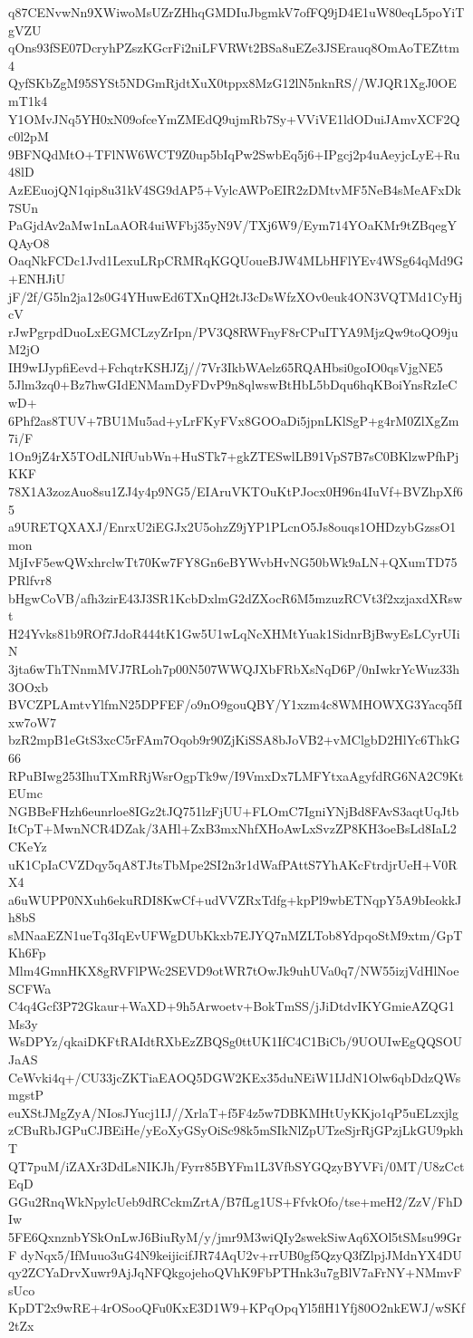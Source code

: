 q87CENvwNn9XWiwoMsUZrZHhqGMDIuJbgmkV7ofFQ9jD4E1uW80eqL5poYiTgVZU
qOns93fSE07DcryhPZszKGcrFi2niLFVRWt2BSa8uEZe3JSErauq8OmAoTEZttm4
QyfSKbZgM95SYSt5NDGmRjdtXuX0tppx8MzG12lN5nknRS//WJQR1XgJ0OEmT1k4
Y1OMvJNq5YH0xN09ofceYmZMEdQ9ujmRb7Sy+VViVE1ldODuiJAmvXCF2Qc0l2pM
9BFNQdMtO+TFlNW6WCT9Z0up5bIqPw2SwbEq5j6+IPgcj2p4uAeyjcLyE+Ru48lD
AzEEuojQN1qip8u31kV4SG9dAP5+VylcAWPoEIR2zDMtvMF5NeB4sMeAFxDk7SUn
PaGjdAv2aMw1nLaAOR4uiWFbj35yN9V/TXj6W9/Eym714YOaKMr9tZBqegYQAyO8
OaqNkFCDc1Jvd1LexuLRpCRMRqKGQUoueBJW4MLbHFlYEv4WSg64qMd9G+ENHJiU
jF/2f/G5ln2ja12s0G4YHuwEd6TXnQH2tJ3cDsWfzXOv0euk4ON3VQTMd1CyHjcV
rJwPgrpdDuoLxEGMCLzyZrIpn/PV3Q8RWFnyF8rCPuITYA9MjzQw9toQO9juM2jO
IH9wIJypfiEevd+FchqtrKSHJZj//7Vr3IkbWAelz65RQAHbsi0goIO0qsVjgNE5
5Jlm3zq0+Bz7hwGIdENMamDyFDvP9n8qlwswBtHbL5bDqu6hqKBoiYnsRzIeCwD+
6Phf2as8TUV+7BU1Mu5ad+yLrFKyFVx8GOOaDi5jpnLKlSgP+g4rM0ZlXgZm7i/F
1On9jZ4rX5TOdLNIfUubWn+HuSTk7+gkZTESwlLB91VpS7B7sC0BKlzwPfhPjKKF
78X1A3zozAuo8su1ZJ4y4p9NG5/EIAruVKTOuKtPJocx0H96n4IuVf+BVZhpXf65
a9URETQXAXJ/EnrxU2iEGJx2U5ohzZ9jYP1PLcnO5Js8ouqs1OHDzybGzssO1mon
MjIvF5ewQWxhrclwTt70Kw7FY8Gn6eBYWvbHvNG50bWk9aLN+QXumTD75PRlfvr8
bHgwCoVB/afh3zirE43J3SR1KcbDxlmG2dZXocR6M5mzuzRCVt3f2xzjaxdXRswt
H24Yvks81b9ROf7JdoR444tK1Gw5U1wLqNcXHMtYuak1SidnrBjBwyEsLCyrUIiN
3jta6wThTNnmMVJ7RLoh7p00N507WWQJXbFRbXsNqD6P/0nIwkrYcWuz33h3OOxb
BVCZPLAmtvYlfmN25DPFEF/o9nO9gouQBY/Y1xzm4c8WMHOWXG3Yacq5fIxw7oW7
bzR2mpB1eGtS3xcC5rFAm7Oqob9r90ZjKiSSA8bJoVB2+vMClgbD2HlYc6ThkG66
RPuBIwg253IhuTXmRRjWsrOgpTk9w/I9VmxDx7LMFYtxaAgyfdRG6NA2C9KtEUmc
NGBBeFHzh6eunrloe8IGz2tJQ751lzFjUU+FLOmC7IgniYNjBd8FAvS3aqtUqJtb
ItCpT+MwnNCR4DZak/3AHl+ZxB3mxNhfXHoAwLxSvzZP8KH3oeBsLd8IaL2CKeYz
uK1CpIaCVZDqy5qA8TJtsTbMpe2SI2n3r1dWafPAttS7YhAKcFtrdjrUeH+V0RX4
a6uWUPP0NXuh6ekuRDI8KwCf+udVVZRxTdfg+kpPl9wbETNqpY5A9bIeokkJh8bS
sMNaaEZN1ueTq3IqEvUFWgDUbKkxb7EJYQ7nMZLTob8YdpqoStM9xtm/GpTKh6Fp
Mlm4GmnHKX8gRVFlPWc2SEVD9otWR7tOwJk9uhUVa0q7/NW55izjVdHlNoeSCFWa
C4q4Gcf3P72Gkaur+WaXD+9h5Arwoetv+BokTmSS/jJiDtdvIKYGmieAZQG1Ms3y
WsDPYz/qkaiDKFtRAIdtRXbEzZBQSg0ttUK1IfC4C1BiCb/9UOUIwEgQQSOUJaAS
CeWvki4q+/CU33jcZKTiaEAOQ5DGW2KEx35duNEiW1IJdN1Olw6qbDdzQWsmgstP
euXStJMgZyA/NIosJYucj1IJ//XrlaT+f5F4z5w7DBKMHtUyKKjo1qP5uELzxjlg
zCBuRbJGPuCJBEiHe/yEoXyGSyOiSc98k5mSIkNlZpUTzeSjrRjGPzjLkGU9pkhT
QT7puM/iZAXr3DdLsNIKJh/Fyrr85BYFm1L3VfbSYGQzyBYVFi/0MT/U8zCctEqD
GGu2RnqWkNpylcUeb9dRCckmZrtA/B7fLg1US+FfvkOfo/tse+meH2/ZzV/FhDIw
5FE6QxnznbYSkOnLwJ6BiuRyM/y/jmr9M3wiQIy2swekSiwAq6XOl5tSMsu99GrF
dyNqx5/IfMuuo3uG4N9keijicifJR74AqU2v+rrUB0gf5QzyQ3fZlpjJMdnYX4DU
qy2ZCYaDrvXuwr9AjJqNFQkgojehoQVhK9FbPTHnk3u7gBlV7aFrNY+NMmvFsUco
KpDT2x9wRE+4rOSooQFu0KxE3D1W9+KPqOpqYl5flH1Yfj80O2nkEWJ/wSKf2tZx
